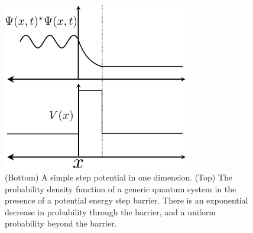 \documentclass[11pt]{afthesis}
\begin{document}
	\begin{figure}[ht!]
		
		\begin{center}
			\includegraphics[width = 3.2in]{figures/tunneling_ex.eps}
		\end{center}
		\caption{(Bottom) A simple step potential in one dimension. (Top) The probability density function of a generic quantum system in the presence of a potential energy step barrier. There is an exponential decrease in probability through the barrier, and a uniform probability beyond the barrier.}
		
		\label{fig:quantum_tunneling}
	\end{figure}
	
	
\end{document}

